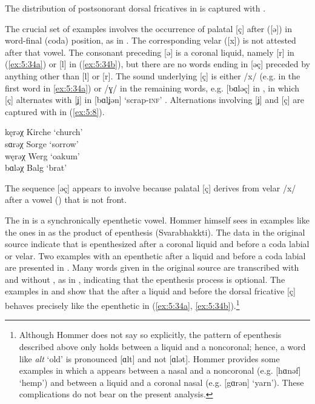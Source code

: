 The distribution of postsonorant dorsal fricatives in  is captured with .

The crucial set of examples involves the occurrence of palatal [ç] after  ([ǝ]) in word-final (coda) position, as in . The corresponding velar ([x]) is not attested after that vowel. The consonant preceding [ǝ] is a coronal liquid, namely [r] in (\ref{ex:5:34a}) or [l] in (\ref{ex:5:34b}), but there are no words ending in [ǝç] preceded by anything other than [l] or [r]. The sound underlying [ç] is either /x/ (e.g. in the first word in \ref{ex:5:34a}) or /ɣ/ in the remaining words, e.g. [bɑlǝç] in , in which [ç] alternates with [ʝ] in [bɑlʝǝn] ‘scrap-\textsc{inf}’ \citep[5]{Hommer1910}. Alternations involving [ʝ] and [ç] are captured with  in (\ref{ex:5:8}).

\ea\label{ex:5:34}
\ea\label{ex:5:34a}  kęrəχ  \tab [kɛrǝç] \tab Kirche \tab ‘church’ \\
     sɑrəχ  \tab [sɑrǝç] \tab Sorge  \tab ‘sorrow’ \\
     węrəχ  \tab [vɛrǝç] \tab Werg   \tab ‘oakum’  \\
\ex\label{ex:5:34b}  bɑləχ  \tab [bɑlǝç] \tab Balg   \tab ‘brat’   \\
\z 
\z 

The sequence [ǝç] appears to involve  because palatal [ç] derives from velar /x/ after a vowel () that is not front.

The  in  is a synchronically epenthetic vowel. Hommer himself sees  in examples like the ones in  as the product of epenthesis (Svarabhakkti). The data in the original source indicate that  is epenthesized after a coronal liquid and before a coda labial or velar. Two examples with an epenthetic  after a liquid and before a coda labial are presented in . Many words given in the original source are transcribed with and without , as in , indicating that the epenthesis process is optional. The examples in  and  show that the  after a liquid and before the dorsal fricative [ç] behaves precisely like the epenthetic  in (\ref{ex:5:34a}, \ref{ex:5:34b}).{\footnote{Although Hommer does not say so explicitly, the pattern of epenthesis described above only holds between a liquid and a noncoronal; hence, a word like \textit{alt} ‘old’ \citep[23]{Hommer1910} is pronounced [ɑlt] and not [ɑlǝt]. Hommer provides some examples in which a  appears between a nasal and a noncoronal (e.g. [hɑnǝf] ‘hemp’) and between a liquid and a coronal nasal (e.g. [gɑrǝn] ‘yarn’). These complications do not bear on the present analysis.}}\largerpage

